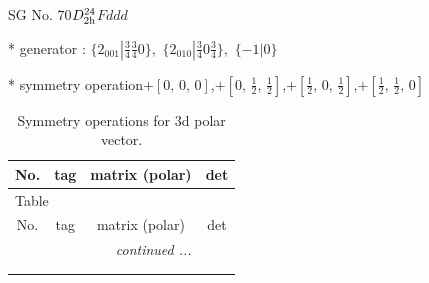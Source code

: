 \documentclass[fleqn,8pt]{jsarticle}
\begin{document}
\setcounter{MaxMatrixCols}{32}

\renewcommand{\tablename}{Table~}
\renewcommand{\figurename}{Figure~}
\begin{center}
\LARGE
SG No. 70\quad$D_{\rm 2h}^{24}$\quad$Fddd$\quad[ orthorhombic ]
\end{center}

* generator : $\{2{}_{001}|\frac{3}{4} \frac{3}{4} 0\},\,\,\{2{}_{010}|\frac{3}{4} 0 \frac{3}{4}\},\,\,\{-1|0\}$

* symmetry operation\quad$+\left[ 0,\, 0,\, 0 \right]$,\quad $+\left[ 0,\, \frac{1}{2},\, \frac{1}{2} \right]$,\quad $+\left[ \frac{1}{2},\, 0,\, \frac{1}{2} \right]$,\quad $+\left[ \frac{1}{2},\, \frac{1}{2},\, 0 \right]$
\renewcommand{\arraystretch}{1.3}
\begin{longtable}{cccc}
\caption{Symmetry operations for 3d polar vector.}
 \\
 \hline \hline
No. & tag & matrix (polar) & det \\ \hline \endfirsthead

\multicolumn{3}{l}{\tablename\ \thetable{}} \\
 \hline \hline
No. & tag & matrix (polar) & det \\ \hline \endhead

 \hline \hline
\multicolumn{3}{r}{\footnotesize\it continued ...} \\ \endfoot

 \hline \hline
\multicolumn{3}{r}{} \\ \endlastfoot


\end{longtable}
\end{document}
